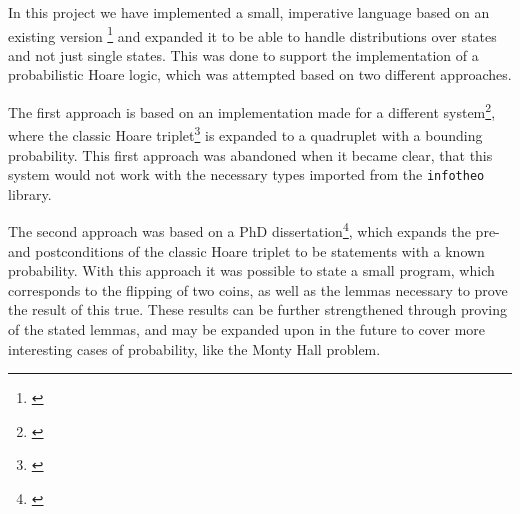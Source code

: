 

In this project we have implemented a small, imperative language based on an existing version \footnote{\textcite{SF1}} and expanded it to be able to handle distributions over states and not just single states. This was done to support the implementation of a probabilistic Hoare logic, which was attempted based on two different approaches.

The first approach is based on an implementation made for a different system\footnote{\textcite{HoareSlides}}, where the classic Hoare triplet\footnote{\textcite{SF2}} is expanded to a quadruplet with a bounding probability. This first approach was abandoned when it became clear, that this system would not work with the necessary types imported from the \texttt{infotheo} library.

The second approach was based on a PhD dissertation\footnote{\textcite{PHdProbExtensions}}, which expands the pre- and postconditions of the classic Hoare triplet to be statements with a known probability. With this approach it was possible to state a small program, which corresponds to the flipping of two coins, as well as the lemmas necessary to prove the result of this true. These results can be further strengthened through proving of the stated lemmas, and may be expanded upon in the future to cover more interesting cases of probability, like the Monty Hall problem.  